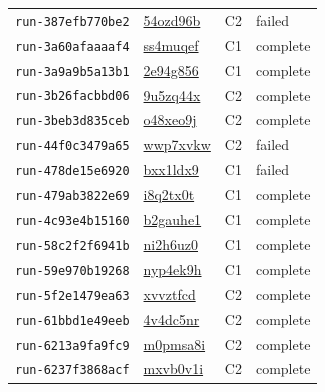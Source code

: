 \begin{longtable}{llll}
\texttt{run-387efb770be2} & \href{https://forge.coreweave.com/wandb/lbxa-corp/collusion-benchmark/runs/54ozd96b}{54ozd96b} & C2 & failed \\
\texttt{run-3a60afaaaaf4} & \href{https://forge.coreweave.com/wandb/lbxa-corp/collusion-benchmark/runs/ss4muqef}{ss4muqef} & C1 & complete \\
\texttt{run-3a9a9b5a13b1} & \href{https://forge.coreweave.com/wandb/lbxa-corp/collusion-benchmark/runs/2e94g856}{2e94g856} & C1 & complete \\
\texttt{run-3b26facbbd06} & \href{https://forge.coreweave.com/wandb/lbxa-corp/collusion-benchmark/runs/9u5zq44x}{9u5zq44x} & C2 & complete \\
\texttt{run-3beb3d835ceb} & \href{https://forge.coreweave.com/wandb/lbxa-corp/collusion-benchmark/runs/o48xeo9j}{o48xeo9j} & C2 & complete \\
\texttt{run-44f0c3479a65} & \href{https://forge.coreweave.com/wandb/lbxa-corp/collusion-benchmark/runs/wwp7xvkw}{wwp7xvkw} & C2 & failed \\
\texttt{run-478de15e6920} & \href{https://forge.coreweave.com/wandb/lbxa-corp/collusion-benchmark/runs/bxx1ldx9}{bxx1ldx9} & C1 & failed \\
\texttt{run-479ab3822e69} & \href{https://forge.coreweave.com/wandb/lbxa-corp/collusion-benchmark/runs/i8q2tx0t}{i8q2tx0t} & C1 & complete \\
\texttt{run-4c93e4b15160} & \href{https://forge.coreweave.com/wandb/lbxa-corp/collusion-benchmark/runs/b2gauhe1}{b2gauhe1} & C1 & complete \\
\texttt{run-58c2f2f6941b} & \href{https://forge.coreweave.com/wandb/lbxa-corp/collusion-benchmark/runs/ni2h6uz0}{ni2h6uz0} & C1 & complete \\
\texttt{run-59e970b19268} & \href{https://forge.coreweave.com/wandb/lbxa-corp/collusion-benchmark/runs/nyp4ek9h}{nyp4ek9h} & C1 & complete \\
\texttt{run-5f2e1479ea63} & \href{https://forge.coreweave.com/wandb/lbxa-corp/collusion-benchmark/runs/xvvztfcd}{xvvztfcd} & C2 & complete \\
\texttt{run-61bbd1e49eeb} & \href{https://forge.coreweave.com/wandb/lbxa-corp/collusion-benchmark/runs/4v4dc5nr}{4v4dc5nr} & C2 & complete \\
\texttt{run-6213a9fa9fc9} & \href{https://forge.coreweave.com/wandb/lbxa-corp/collusion-benchmark/runs/m0pmsa8i}{m0pmsa8i} & C2 & complete \\
\texttt{run-6237f3868acf} & \href{https://forge.coreweave.com/wandb/lbxa-corp/collusion-benchmark/runs/mxvb0v1i}{mxvb0v1i} & C2 & complete \\

\end{longtable}
